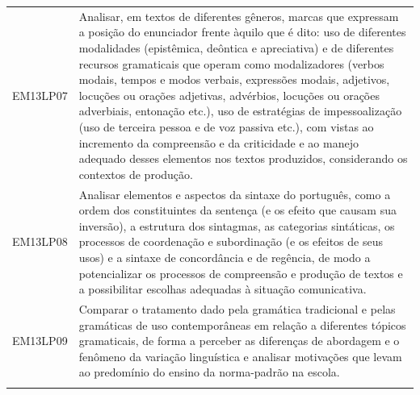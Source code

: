 \documentclass[12pt]{extarticle}
\begin{document}
\begin{longtable}{ll}
EM13LP07   & Analisar, em textos de diferentes gêneros, marcas que expressam a posição do enunciador frente àquilo que é dito: uso de diferentes modalidades (epistêmica, deôntica e apreciativa) e de diferentes recursos gramaticais que operam como modalizadores (verbos modais, tempos e modos verbais, expressões modais, adjetivos, locuções ou orações adjetivas, advérbios, locuções ou orações adverbiais, entonação etc.), uso de estratégias de impessoalização (uso de terceira pessoa e de voz passiva etc.), com vistas ao incremento da compreensão e da criticidade e ao manejo adequado desses elementos nos textos produzidos, considerando os contextos de produção.                                                                                                                                           \\
\rowcolor[HTML]{FFF} 
EM13LP08   & Analisar elementos e aspectos da sintaxe do português, como a ordem dos constituintes da sentença (e os efeito que causam sua inversão), a estrutura dos sintagmas, as categorias sintáticas, os processos de coordenação e subordinação (e os efeitos de seus usos) e a sintaxe de concordância e de regência, de modo a potencializar os processos de compreensão e produção de textos e a possibilitar escolhas adequadas à situação comunicativa.                                                                                                                                                                                                                                                                                                                                                                 \\
\rowcolor[HTML]{E0F7FA} 
EM13LP09   & Comparar o tratamento dado pela gramática tradicional e pelas gramáticas de uso contemporâneas em relação a diferentes tópicos gramaticais, de forma a perceber as diferenças de abordagem e o fenômeno da variação linguística e analisar motivações que levam ao predomínio do ensino da norma-padrão na escola.                                                                                                                                                                                                                                                                                                                                                                                                                                                                                                    \\
\rowcolor[HTML]{FFF} 

\end{longtable}
\end{document}
